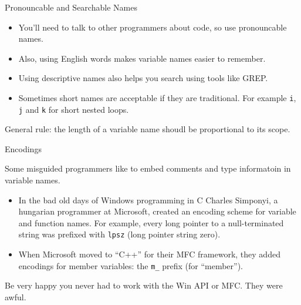 \documentclass{beamer}
\begin{document}
\begin{frame}[fragile]{Pronouncable and Searchable Names}


\begin{itemize}
\item You'll need to talk to other programmers about code, so use pronouncable names.
\item Also, using English words makes variable names easier to remember.
\item Using descriptive names also helps you search using tools like GREP.
\item Sometimes short names are acceptable if they are traditional.  For example {\tt i}, {\tt j} and {\tt k} for short nested loops.
\end{itemize}

General rule: the length of a variable name shoudl be proportional to its scope.

\end{frame}

\begin{frame}[fragile]{Encodings}


Some misguided programmers like to embed comments and type informatoin in variable names.
\begin{itemize}
\item In the bad old days of Windows programming in C Charles Simponyi, a hungarian programmer at Microsoft, created an encoding scheme for variable and function names.  For example, every long pointer to a null-terminated string was prefixed with {\tt lpsz} (long pointer string zero).
\item When Microsoft moved to ``C++'' for their MFC framework, they added encodings for member variables: the {\tt m\_} prefix (for ``member'').
\end{itemize}
Be very happy you never had to work with the Win API or MFC.  They were awful.

\end{frame}
\end{document}
